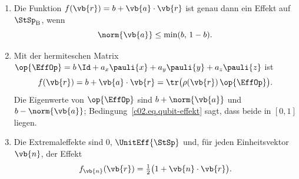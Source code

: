 \begin{proposition}\label{c02.prop.qubit-effekte}
  \begin{enumerate}
    \item Die Funktion $f(\vb{r}) = b + \vb{a}\cdot\vb{r}$ ist genau dann ein Effekt auf
      $\StSp_{\mathrm{B}}$, wenn
      \begin{equation}\label{c02.eq.qubit-effekt}
        \norm{\vb{a}} \leq \min(b,\, 1-b) .
      \end{equation}
    \item Mit der hermiteschen Matrix
      $\op{\EffOp} = b\, \Id + a_x \pauli{x} + a_y \pauli{y} + a_z \pauli{z}$ ist
      \begin{equation}\label{c02.eq.spurformel}
        f(\vb{r}) = b + \vb{a}\cdot\vb{r} = \tr\bigl(\rho(\vb{r})\, \op{\EffOp}\bigr) .
      \end{equation}
      Die Eigenwerte von $\op{\EffOp}$ sind $b + \norm{\vb{a}}$ und $b - \norm{\vb{a}}$;
      Bedingung~\eqref{c02.eq.qubit-effekt} sagt, dass beide in $[0,1]$ liegen.
    \item Die Extremaleffekte sind $0$, $\UnitEff{\StSp}$ und, für jeden Einheitsvektor
      $\vb{n}$, der Effekt
      \begin{equation}\label{c02.eq.qubit-extremal}
        f_{\vb{n}}(\vb{r}) = \tfrac12\bigl(1 + \vb{n}\cdot\vb{r}\bigr) .
      \end{equation}
  \end{enumerate}
\end{proposition}
